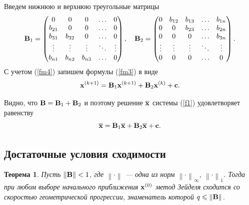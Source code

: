 \documentclass[12pt]{article}
\newtheorem{theorem}{Теорема}
\begin{document}
	Введем нижнюю и верхнюю треугольные матрицы
	\begin{equation}
		\bold{B}_1=\begin{pmatrix}
			0      & 0 & 0 & \ldots & 0 \\
			b_{21} & 0 & 0 & \ldots & 0 \\
			b_{31} & b_{32} & 0 & \ldots & 0 \\
			\vdots & \vdots & \vdots & \ddots & \vdots \\
			b_{n1} & b_{n2} & b_{n3} & \ldots & 0 \\
		\end{pmatrix},\quad
			\bold{B}_2=\begin{pmatrix}
			0      & b_{12} & b_{13} & \ldots & b_{1n} \\
			0 & 0 & b_{23} & \ldots & b_{2n} \\
			0 & 0 & 0 & \ldots & b_{3n} \\
			\vdots & \vdots & \vdots & \ddots & \vdots \\
			0 & 0 & 0 & \ldots & 0 \\
		\end{pmatrix}.\label{fm4}
	\end{equation}
	С учетом (\ref{fm4}) запишем формулы (\ref{fm3}) в виде
	\begin{equation}
		\bold{x}^{\left(k+1\right)}=\bold{B}_1\bold{x}^{\left(k+1\right)}+\bold{B}_2 \bold{x}^{\left(k\right)}+\bold{c}.
	\end{equation}
	
	Видно, что $\bold{B}=\bold{B}_1+\bold{B}_2$ и поэтому решение $\overline{\bold{x}}$ системы (\ref{f1}) удовлетворяет равенству
	\begin{equation}
		\overline{\bold{x}}=\bold{B}_1\overline{\bold{x}}+\bold{B}_2\overline{\bold{x}}+\bold{c}.
	\end{equation}
	
	\subsection*{Достаточные условия сходимости}

	\begin{theorem}
		Пусть $\left\|\bold{B}\right\|<1$, где $\left\|\cdot\right\|$ --- одна из норм $\left\|\cdot\right\|_{\infty}$, $\left\|\cdot\right\|_{1}$. Тогда при любом выборе начального приближения $\bold{x}^{\left(0\right)}$ метод Зейделя сходится со скоростью геометрической прогрессии, знаменатель которой $q\leqslant \left\|\bold{B}\right\|$.
	\end{theorem}
	
\end{document}
